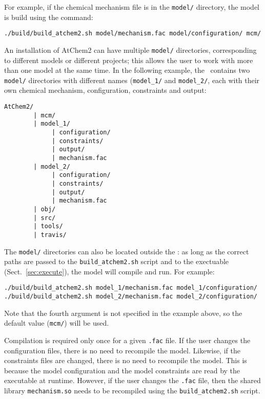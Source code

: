 For example, if the chemical mechanism file is in the \texttt{model/}
directory, the model is build using the command:

\begin{verbatim}
./build/build_atchem2.sh model/mechanism.fac model/configuration/ mcm/
\end{verbatim}

An installation of AtChem2 can have multiple \texttt{model/}
directories, corresponding to different models or different
projects; this allows the user to work with more than one model at the same
time. In the following example, the \maindir\ contains two
\texttt{model/} directories with different names (\texttt{model\_1/}
and \texttt{model\_2/}, each with their own chemical mechanism,
configuration, constraints and output:

\begin{verbatim}
AtChem2/
        | mcm/
        | model_1/
             | configuration/
             | constraints/
             | output/
             | mechanism.fac
        | model_2/
             | configuration/
             | constraints/
             | output/
             | mechanism.fac
        | obj/
        | src/
        | tools/
        | travis/
\end{verbatim}

The \texttt{model/} directories can also be located outside the
\maindir: as long as the correct paths are passed to the
\texttt{build\_atchem2.sh} script and to the exectuable (Sect.~\ref{sec:execute}),
the model will compile and run. For example:

\begin{verbatim}
./build/build_atchem2.sh model_1/mechanism.fac model_1/configuration/
./build/build_atchem2.sh model_2/mechanism.fac model_2/configuration/
\end{verbatim}

Note that the fourth argument is not specified in the example above,
so the default value (\texttt{mcm/}) will be used.

Compilation is required only once for a given \texttt{.fac} file. If
the user changes the configuration files, there is no need to
recompile the model. Likewise, if the constraints files are changed,
there is no need to recompile the model. This is because the model
configuration and the model constraints are read by the executable at
runtime. However, if the user changes the \texttt{.fac} file,
then the shared library \texttt{mechanism.so}
needs to be recompiled using the \texttt{build\_atchem2.sh} script.

